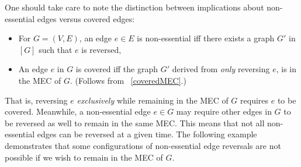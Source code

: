 \begin{remark}
One should take care to note the distinction between implications about non-essential edges versus covered edges: 
\begin{itemize}
	\item For $G = (V,E)$, an edge $e \in E$ is non-essential iff there exists a graph $G'$ in $[G]$ such that $e$ is reversed,
	\item An edge $e$ in $G$ is covered iff the graph $G'$ derived from \textit{only} reversing $e$, is in the MEC of $G$. (Follows from ~\cref{coveredMEC}.)
\end{itemize}
That is, reversing $e$ \textit{exclusively} while remaining in the MEC of $G$ requires $e$ to be covered. Meanwhile, a non-essential edge $e \in G$ may require other edges in $G$ to be reversed as well to remain in the same MEC. This means that not all non-essential edges can be reversed at a given time. The following example demonstrates that some configurations of non-essential edge reversals are not possible if we wish to remain in the MEC of $G$.
\end{remark}

